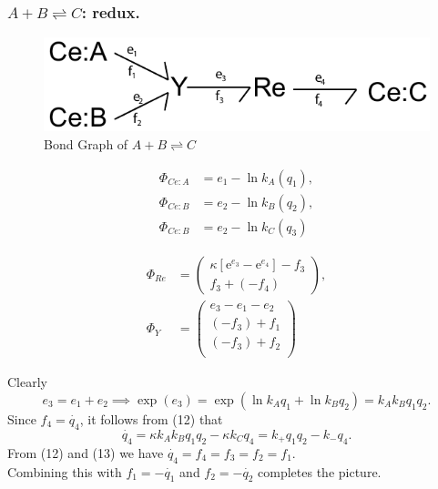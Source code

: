 \documentclass[10pt,reqno]{beamer}
\newcommand{\e}{\mathrm{e}}
\begin{document}
\begin{frame}
\frametitle{$A+B\rightleftharpoons C$: redux.}
{\scriptsize
\begin{figure}
	\includegraphics[scale=0.5]{images/bondgraph_abc_final}
	\caption{Bond Graph of $A+B \rightleftharpoons C$}
\end{figure}
\begin{minipage}{0.475\textwidth}
\begin{align}
\Phi_{Ce:A} &= e_1 - \ln k_A(q_1),\\
\Phi_{Ce:B} &= e_2 - \ln k_B(q_2),\\
\Phi_{Ce:B} &= e_2 - \ln k_C(q_3)
\end{align}
\end{minipage}
\begin{minipage}{0.475\textwidth}
\begin{align}\Phi_{Re} &= \left(
\begin{matrix}
\kappa\left[\e^{e_3} - \e^{e_4}\right] - f_3\\
f_3 + (- f_4)
\end{matrix}
\right),\\
\Phi_{Y} &= \left(\begin{matrix}
e_3 - e_1 - e_2 \\
(-f_3) + f_1\\
(-f_3) + f_2\\
\end{matrix}\right)
\end{align}
\end{minipage}

\vfill
Clearly
\[
e_3 = e_1 + e_2 \implies \exp(e_3) = \exp(\ln k_A q_1 + \ln k_Bq_2) = k_Ak_B q_1q_2.
\]
Since $f_4 = \dot{q_4}$,  it follows from (12) that
\[
\dot{q_4} =  \kappa k_Ak_B q_1q_2 - \kappa k_C q_4 = k_+q_1q_2 - k_-q_4.
\]
From (12) and (13) we have $\dot{q_4} = f_4 =f_3= f_2 = f_1$.\\
Combining this with $f_1 = -\dot{q_1} $ and $f_2 = -\dot{q_2}$ completes the picture.
}
\end{frame}
\end{document}
